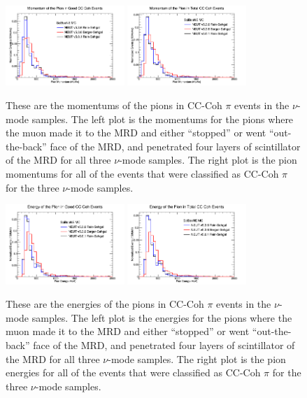 \documentclass[11pt]{article}
\begin{document}
\begin{figure}[H]
\centering
\includegraphics[width=0.4\textwidth]{NMPionPlottingImages/8-NMPionPlotting.png}
\includegraphics[width=0.4\textwidth]{NMPionPlottingImages/11-NMPionPlotting.png}
\caption{These are the momentums of the pions in CC-Coh $\pi$ events in the $\nu$-mode samples. The left plot is the momentums for the pions where the muon made it to the MRD and either ``stopped'' or went ``out-the-back'' face of the MRD, and penetrated four layers of scintillator of the MRD for all three $\nu$-mode samples. The right plot is the pion momentums for all of the events that were classified as CC-Coh $\pi$ for the three $\nu$-mode samples.}
\label{fig:app:NMPionMom}
\end{figure}

\begin{figure}[H]
\centering
\includegraphics[width=0.4\textwidth]{NMPionPlottingImages/9-NMPionPlotting.png}
\includegraphics[width=0.4\textwidth]{NMPionPlottingImages/12-NMPionPlotting.png}
\caption{These are the energies of the pions in CC-Coh $\pi$ events in the $\nu$-mode samples. The left plot is the energies for the pions where the muon made it to the MRD and either ``stopped'' or went ``out-the-back'' face of the MRD, and penetrated four layers of scintillator of the MRD for all three $\nu$-mode samples. The right plot is the pion energies for all of the events that were classified as CC-Coh $\pi$ for the three $\nu$-mode samples.}
\label{fig:app:NMPionEnergy}
\end{figure}
\end{document}
